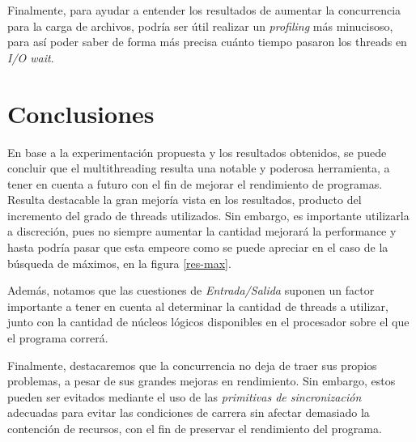 \documentclass[a4paper]{article}
\begin{document}
Finalmente, para ayudar a entender los resultados de aumentar la concurrencia para la carga de archivos, podría ser útil realizar un \textit{profiling} más minucisoso, para así poder saber de forma más precisa cuánto tiempo pasaron los threads en \textit{I/O wait}.

\section{Conclusiones}

En base a la experimentación propuesta y los resultados obtenidos, se puede concluir que el multithreading resulta una notable y poderosa herramienta, a tener en cuenta a futuro con el fin de mejorar el rendimiento de programas. Resulta destacable la gran mejoría vista en los resultados, producto del incremento del grado de threads utilizados. Sin embargo, es importante utilizarla a discreción, pues no siempre aumentar la cantidad mejorará la performance y hasta podría pasar que esta empeore como se puede apreciar en el caso de la búsqueda de máximos, en la figura \ref{res-max}.

Además, notamos que las cuestiones de \textit{Entrada/Salida} suponen un factor importante a tener en cuenta al determinar la cantidad de threads a utilizar, junto con la cantidad de núcleos lógicos disponibles en el procesador sobre el que el programa correrá.

Finalmente, destacaremos que la concurrencia no deja de traer sus propios problemas, a pesar de sus grandes mejoras en rendimiento. Sin embargo, estos pueden ser evitados mediante el uso de las \textit{primitivas de sincronización} adecuadas para evitar las condiciones de carrera sin afectar demasiado la contención de recursos, con el fin de preservar el rendimiento del programa.
\end{document}
